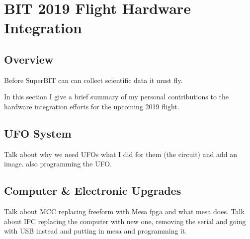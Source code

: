 \chapter{BIT 2019 Flight Hardware Integration}
\section{Overview}
Before SuperBIT can can collect scientific data it must fly. 
\par
In this section I give a brief summary of my personal contributions to the hardware integration efforts for the upcoming 2019 flight. 

\section{UFO System}
Talk about why we need UFOs what I did for them (the circuit) and add an image. also programming the UFO.

\section{Computer \& Electronic Upgrades}
Talk about MCC replacing freeform with Mesa fpga and what mesa does. 
Talk about IFC replacing the computer with new one, removing the serial and going with USB instead and putting in mesa and programming it.

